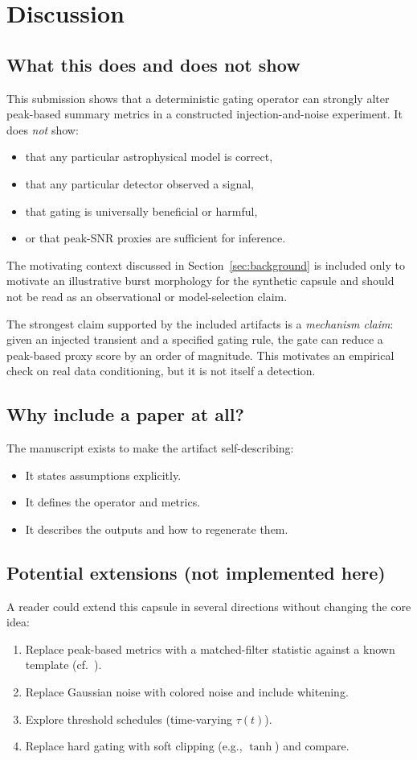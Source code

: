 \section{Discussion}
\label{sec:discussion}

\subsection{What this does and does not show}
This submission shows that a deterministic gating operator can strongly alter peak-based summary metrics in a constructed injection-and-noise experiment. It does \emph{not} show:
\begin{itemize}
\item that any particular astrophysical model is correct,
\item that any particular detector observed a signal,
\item that gating is universally beneficial or harmful,
\item or that peak-SNR proxies are sufficient for inference.
\end{itemize}

The motivating context discussed in Section~\ref{sec:background} is included only to motivate an illustrative burst morphology for the synthetic capsule and should not be read as an observational or model-selection claim.

The strongest claim supported by the included artifacts is a \emph{mechanism claim}: given an injected transient and a specified gating rule, the gate can reduce a peak-based proxy score by an order of magnitude. This motivates an empirical check on real data conditioning, but it is not itself a detection.

\subsection{Why include a paper at all?}
The manuscript exists to make the artifact self-describing:
\begin{itemize}
\item It states assumptions explicitly.
\item It defines the operator and metrics.
\item It describes the outputs and how to regenerate them.
\end{itemize}

\subsection{Potential extensions (not implemented here)}
A reader could extend this capsule in several directions without changing the core idea:
\begin{enumerate}
\item Replace peak-based metrics with a matched-filter statistic against a known template (cf.\ \cite{cornish2021}).
\item Replace Gaussian noise with colored noise and include whitening.
\item Explore threshold schedules (time-varying $\tau(t)$).
\item Replace hard gating with soft clipping (e.g., $\tanh$) and compare.
\end{enumerate}

